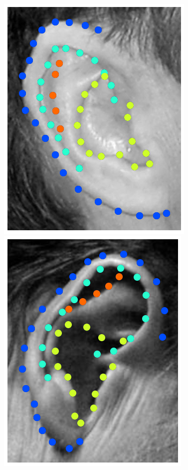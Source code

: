 \begin{figure}
    \includegraphics[height=\flowh]{resources/Ear_Deformable_Model/dbs/db_4} 
    \hfill
    \includegraphics[height=\flowh]{resources/Ear_Deformable_Model/dbs/db_5}
    \hfill

\end{figure}
